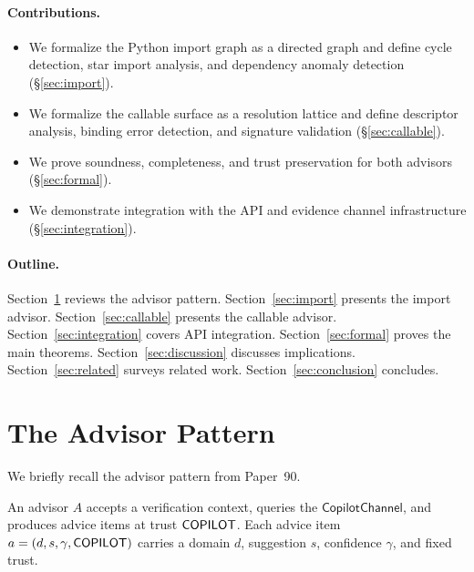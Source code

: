 \documentclass[11pt]{article}
\newcommand{\CopChan}{\mathsf{CopilotChannel}}
\begin{document}
\paragraph{Contributions.}
\begin{itemize}[leftmargin=2em]
\item We formalize the Python import graph as a directed graph and
  define cycle detection, star import analysis, and dependency
  anomaly detection (\S\ref{sec:import}).

\item We formalize the callable surface as a resolution lattice
  and define descriptor analysis, binding error detection, and
  signature validation (\S\ref{sec:callable}).

\item We prove soundness, completeness, and trust preservation
  for both advisors (\S\ref{sec:formal}).

\item We demonstrate integration with the \JuGeo{} API and
  evidence channel infrastructure (\S\ref{sec:integration}).
\end{itemize}

\paragraph{Outline.}
Section~\ref{sec:pattern} reviews the advisor pattern.
Section~\ref{sec:import} presents the import advisor.
Section~\ref{sec:callable} presents the callable advisor.
Section~\ref{sec:integration} covers API integration.
Section~\ref{sec:formal} proves the main theorems.
Section~\ref{sec:discussion} discusses implications.
Section~\ref{sec:related} surveys related work.
Section~\ref{sec:conclusion} concludes.

\section{The Advisor Pattern}
\label{sec:pattern}

We briefly recall the advisor pattern from Paper~90.

\begin{definition}[Advisor]
\label{def:advisor}
An advisor $A$ accepts a verification context, queries the
$\CopChan$, and produces advice items at trust $\mathsf{COPILOT}$.
Each advice item $a = (d, s, \gamma, \mathsf{COPILOT})$ carries a
domain $d$, suggestion $s$, confidence $\gamma$, and fixed trust.
\end{definition}
\end{document}
